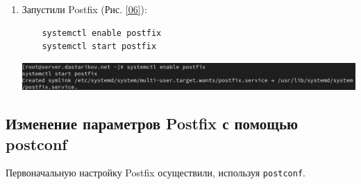 \begin{enumerate}
\item Запустили Postfix (Рис. \ref{06}):
  \begin{verbatim}
    systemctl enable postfix
    systemctl start postfix
  \end{verbatim}
\begin{center}
    \centering
    \includegraphics[width=\textwidth]{../images/image06.png}
    \label{06}
\end{center}

\end{enumerate}

\subsection{Изменение параметров Postfix с помощью postconf}
Первоначальную настройку Postfix осуществили, используя \texttt{postconf}.

